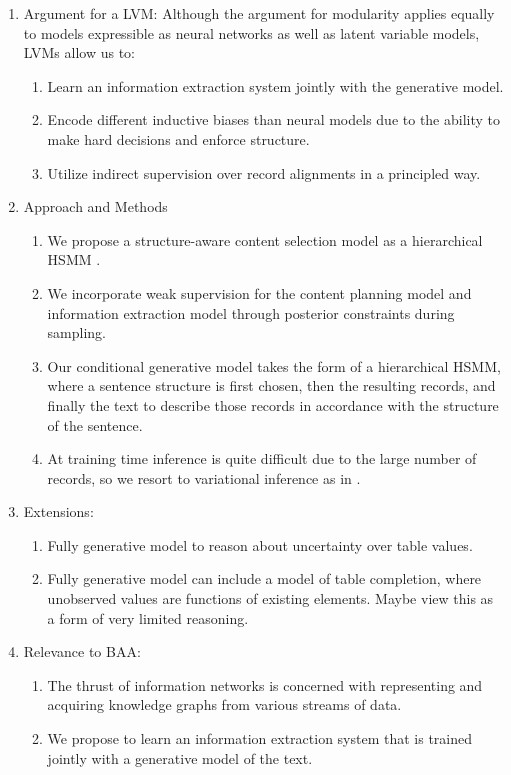 \documentclass[11pt]{article}
\begin{document}
\begin{enumerate}
\item Argument for a LVM:
Although the argument for modularity applies equally to models expressible as
neural networks as well as latent variable models, LVMs allow us to:
\begin{enumerate}
\item Learn an information extraction system jointly with the generative model.
\item Encode different inductive biases than neural models due to the ability to make hard decisions
and enforce structure.
\item Utilize indirect supervision over record alignments in a principled way.
\end{enumerate}
\item Approach and Methods
\begin{enumerate}
\item We propose a structure-aware content selection \citep{sauper2009wiki} model
as a hierarchical HSMM \citep{wiseman2018template}.
\item We incorporate weak supervision for the content planning model and
information extraction model through posterior constraints during sampling.
\item Our conditional generative model takes the form of a hierarchical
HSMM, where a sentence structure is first chosen, then the resulting records, and finally
the text to describe those records in accordance with the structure of the sentence.
\item At training time inference is quite difficult due to the large number of records,
so we resort to variational inference as in \citep{deng2018vattn}. 
\end{enumerate}
\item Extensions:
\begin{enumerate}
\item Fully generative model to reason about uncertainty over table values.
\item Fully generative model can include a model of table completion,
where unobserved values are functions of existing elements.
Maybe view this as a form of very limited reasoning.
\end{enumerate}
\item Relevance to BAA:
\begin{enumerate}
\item The thrust of information networks is concerned with representing
and acquiring knowledge graphs from various streams of data.
\item We propose to learn an information extraction system that is trained 
jointly with a generative model of the text.
\end{enumerate}
\end{enumerate}



\end{document}
